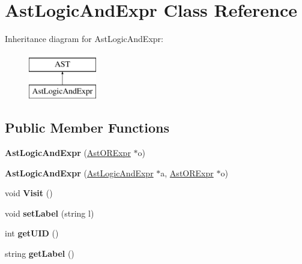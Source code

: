 \hypertarget{classAstLogicAndExpr}{\section{Ast\-Logic\-And\-Expr Class Reference}
\label{classAstLogicAndExpr}
}
Inheritance diagram for Ast\-Logic\-And\-Expr\-:\begin{figure}[H]
\begin{center}
\leavevmode
\includegraphics[height=2.000000cm]{classAstLogicAndExpr}
\end{center}
\end{figure}
\subsection*{Public Member Functions}
\begin{DoxyCompactItemize}
\item 
\hypertarget{classAstLogicAndExpr_a7c71466f3ec88e35ac925d7d69fe5e3b}{{\bfseries Ast\-Logic\-And\-Expr} (\hyperlink{classAstORExpr}{Ast\-O\-R\-Expr} $\ast$o)}\label{classAstLogicAndExpr_a7c71466f3ec88e35ac925d7d69fe5e3b}

\item 
\hypertarget{classAstLogicAndExpr_a522ff78d2ca7bf2a3882ad6872b9f1e4}{{\bfseries Ast\-Logic\-And\-Expr} (\hyperlink{classAstLogicAndExpr}{Ast\-Logic\-And\-Expr} $\ast$a, \hyperlink{classAstORExpr}{Ast\-O\-R\-Expr} $\ast$o)}\label{classAstLogicAndExpr_a522ff78d2ca7bf2a3882ad6872b9f1e4}

\item 
\hypertarget{classAstLogicAndExpr_a4fc66df5e58e7bea73a712986e94ddcf}{void {\bfseries Visit} ()}\label{classAstLogicAndExpr_a4fc66df5e58e7bea73a712986e94ddcf}

\item 
\hypertarget{classAST_a71d680856e95ff89f55d5311a552eba6}{void {\bfseries set\-Label} (string l)}\label{classAST_a71d680856e95ff89f55d5311a552eba6}

\item 
\hypertarget{classAST_ab7a5b1d9f1c2de0d98deb356f724a42c}{int {\bfseries get\-U\-I\-D} ()}\label{classAST_ab7a5b1d9f1c2de0d98deb356f724a42c}

\item 
\hypertarget{classAST_aee029be902fffc927d16ccb03eb922ad}{string {\bfseries get\-Label} ()}\label{classAST_aee029be902fffc927d16ccb03eb922ad}

\end{DoxyCompactItemize}

